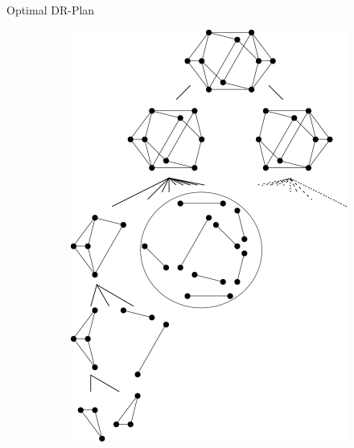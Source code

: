 \documentclass{mySlides}
\begin{document}
\begin{frame}{Optimal DR-Plan}
\begin{figure}
        \hspace{.1\linewidth}
        \begin{subfigure}{.35\linewidth}\centering
            \includegraphics[width=\linewidth]{../../img/svg/new_overconstrained_not_optimal}
        \end{subfigure}
    \end{figure}
\end{frame}
\end{document}
